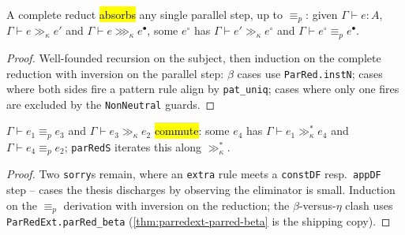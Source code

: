 \begin{theorem}
\label{thm:expb-parred-triangle}
\leanok
{}

 A complete reduct \hl{absorbs} any single parallel step, up to $\equiv_p$: given
$\Gamma\vdash e:A$, $\Gamma\vdash e\gg_\kappa e'$ and $\Gamma\vdash e\ggg_\kappa e^\bullet$, some
$e^\circ$ has $\Gamma\vdash e'\gg_\kappa e^\circ$ and $\Gamma\vdash e^\circ\equiv_p e^\bullet$.
\end{theorem}
\begin{proof}
\leanok
{} Well-founded recursion on the subject, then induction on the complete reduction with
inversion on the parallel step: $\beta$ cases use \texttt{ParRed.instN}; cases where both sides fire
a pattern rule align by \texttt{pat\_uniq}; cases where only one fires are excluded by the
\texttt{NonNeutral} guards.
\end{proof}

\begin{theorem}
\label{thm:expb-normaleq-parred}
\leanok
{}

 $\Gamma\vdash e_1\equiv_p e_3$ and $\Gamma\vdash e_3\gg_\kappa e_2$
\hl{commute}: some $e_4$ has $\Gamma\vdash e_1\gg_\kappa^{*} e_4$ and $\Gamma\vdash e_4\equiv_p e_2$;
\texttt{parRedS} iterates this along $\gg_\kappa^{*}$.
\end{theorem}
\begin{proof}
\stSorry{} Two \texttt{sorry}s remain, where an \texttt{extra} rule meets a \texttt{constDF} resp.\
\texttt{appDF} step -- cases the thesis discharges by observing the eliminator is small.
\lead{Idea} Induction on the $\equiv_p$ derivation with inversion on the reduction; the
$\beta$-versus-$\eta$ clash uses \texttt{ParRedExt.parRed\_beta}
(\ref{thm:parredext-parred-beta} is the shipping copy).
\end{proof}

